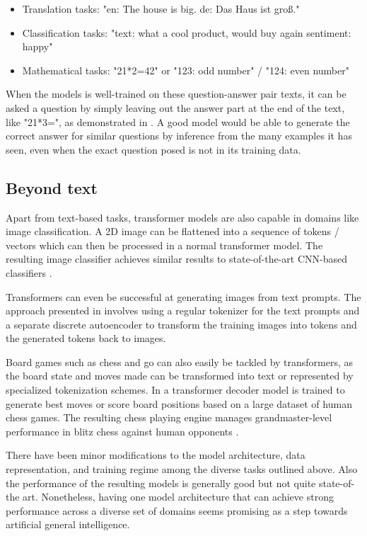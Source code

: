 \begin{itemize}
\item Translation tasks: "en: The house is big.  de: Das Haus ist groß."
\item Classification tasks: "text:  what a cool product, would buy again  sentiment: happy"
\item Mathematical tasks: "21*2=42" or "123: odd number" / "124: even number" 
\end{itemize}

When the models is well-trained on these question-answer pair texts, it can be asked a question by simply leaving out the answer part at the end of the text, like "21*3=", as demonstrated in \cite{alammar-transformer}. A good model would be able to generate the correct answer for similar questions by inference from the many examples it has seen, even when the exact question posed is not in its training data.

\subsection{Beyond text}

Apart from text-based tasks, transformer models are also capable in domains like image classification.
A 2D image can be flattened into a sequence of tokens / vectors which can then be processed in a normal transformer model. The resulting image classifier achieves similar results to state-of-the-art CNN-based classifiers .

Transformers can even be successful at generating images from text prompts. The approach presented in \cite{cogview} involves using a regular tokenizer for the text prompts and a separate discrete autoencoder to transform the training images into tokens and the generated tokens back to images.

Board games such as chess and go can also easily be tackled by transformers, as the board state and moves made can be transformed into text or represented by specialized tokenization schemes.
In \cite{grandmasterlevelchess} a transformer decoder model is trained to generate best moves or score board positions based on a large dataset of human chess games. The resulting chess playing engine manages grandmaster-level performance in blitz chess against human opponents .

There have been minor modifications to the model architecture, data representation, and training regime among the diverse tasks outlined above. Also the performance of the resulting models is generally good but not quite state-of-the art. Nonetheless, having one model architecture that can achieve strong performance across a diverse set of domains seems promising as a step towards artificial general intelligence.


